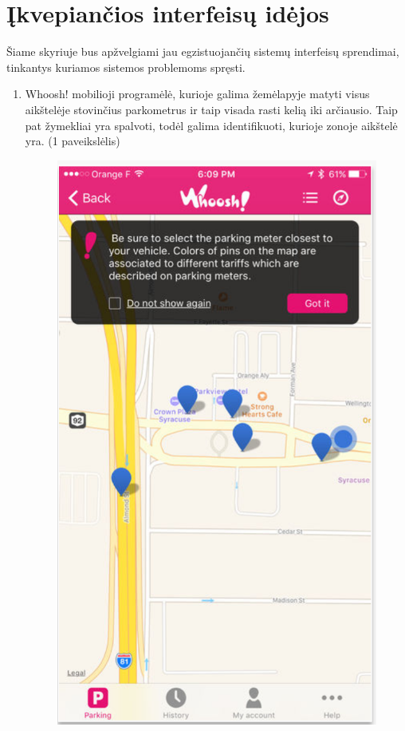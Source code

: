 \documentclass{VUMIFPSkursinis}
\begin{document}
\section{Įkvepiančios interfeisų idėjos}
Šiame skyriuje bus apžvelgiami jau egzistuojančių sistemų interfeisų sprendimai, tinkantys kuriamos sistemos problemoms spręsti.
\begin{enumerate}
	\item
		\begin{samepage}
			Whoosh! mobilioji programėlė, kurioje galima žemėlapyje matyti visus aikštelėje  stovinčius parkometrus ir taip visada rasti kelią iki arčiausio. Taip pat žymekliai yra spalvoti, todėl galima identifikuoti, kurioje zonoje aikštelė yra. (1 paveikslėlis)
			\begin{figure}[H]
				\centering
				\includegraphics[scale=0.5]{img/whoosh}

\end{figure}
\end{samepage}
\end{enumerate}
\end{document}
